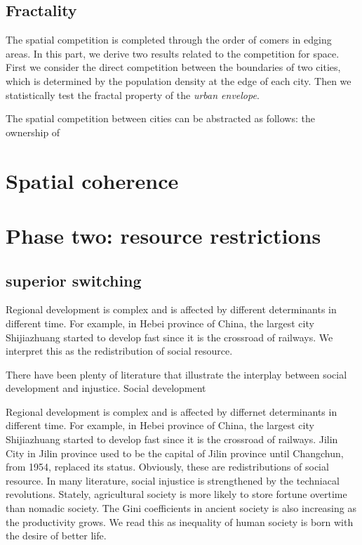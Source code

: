 \documentclass[aps,prl]{revtex4-1}
\begin{document}
\subsection{Fractality}

The spatial competition is completed through the order of comers in edging areas. In this part, we derive two results related to the competition for space. First we consider the direct competition between the boundaries of two cities, which is determined by the population density at the edge of each city. Then we statistically test the fractal property of the \emph{urban envelope}. 

The spatial competition between cities can be abstracted as follows: the ownership of 

\section{Spatial coherence}

\section{Phase two: resource restrictions}

\subsection{superior switching} 

Regional development is complex and is affected by different determinants in different time. For example, in Hebei province of China, the largest city Shijiazhuang started to develop fast since it is the crossroad of railways. We interpret this as the redistribution of social resource. 

There have been plenty of literature\cite{bowles2019neolithic} that illustrate the interplay between social development and injustice. Social development 

Regional development is complex and is affected by differnet determinants in different time. For example, in Hebei province of China, the largest city Shijiazhuang started to develop fast since it is the crossroad of railways. Jilin City in Jilin province used to be the capital of Jilin province until Changchun, from 1954, replaced its status. Obviously, these are redistributions of social resource. In many literature, social injustice is strengthened by the techniacal revolutions. Stately, agricultural society is more likely to store fortune overtime than nomadic society\cite{doi:10.1086/701789}. The Gini coefficients in ancient society is also increasing as the productivity grows\cite{kohler2017greater}. We read this as inequality of human society is born with the desire of better life. 
\end{document}

